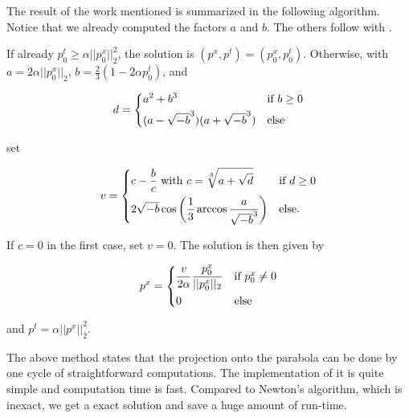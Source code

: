         The result of the work mentioned is summarized in the following algorithm. Notice that we already computed the factors $a$ and $b$. The others follow with \cite{kelvey-ajp}.

            \begin{algorithm}

                If already $p_{0}^{t} \ge \alpha ||p_{0}^{x}||_{2}^{2}$, the solution is $(p^{x}, p^{t}) = (p_{0}^{x}, p_{0}^{t})$. Otherwise, with $a = 2 \alpha ||p_{0}^{x}||_{2}$, $b = \frac{2}{3} (1 - 2 \alpha p_{0}^{t})$, and

                    \[
                        d =
                            \begin{dcases*}
                                a^{2} + b^{3} & \textnormal{if $b \ge 0$}\\
                                (a - \sqrt{-b}^{3})(a + \sqrt{-b}^{3}) & \textnormal{else}
                            \end{dcases*}
                    \]

                set

                    \[
                        v =
                            \begin{dcases*}
                                c - \frac{b}{c} \,\, \textnormal{with} \,\, c = \sqrt[3]{a + \sqrt{d}} & \textnormal{if $d \ge 0$}\\
                                2 \sqrt{-b} \cos \bigg( \frac{1}{3} \arccos \frac{a}{\sqrt{-b}^{3}} \bigg) & \textnormal{else}.
                            \end{dcases*}
                    \]

                If $c = 0$ in the first case, set $v = 0$. The solution is then given by

                    \[
                        p^{x} =
                            \begin{dcases*}
                                \frac{v}{2\alpha} \frac{p_{0}^{x}}{||p_{0}^{x}||_{2}} & \textnormal{if $p_{0}^{x} \ne 0$}\\
                                0 & \textnormal{else}
                            \end{dcases*}
                    \]

                and $p^{t} = \alpha ||p^{x}||_{2}^{2}$.
            \end{algorithm}

        The above method states that the projection onto the parabola can be done by one cycle of straightforward computations. The implementation of it is quite simple and computation time is fast. Compared to Newton's algorithm, which is inexact, we get a exact solution and save a huge amount of run-time.


